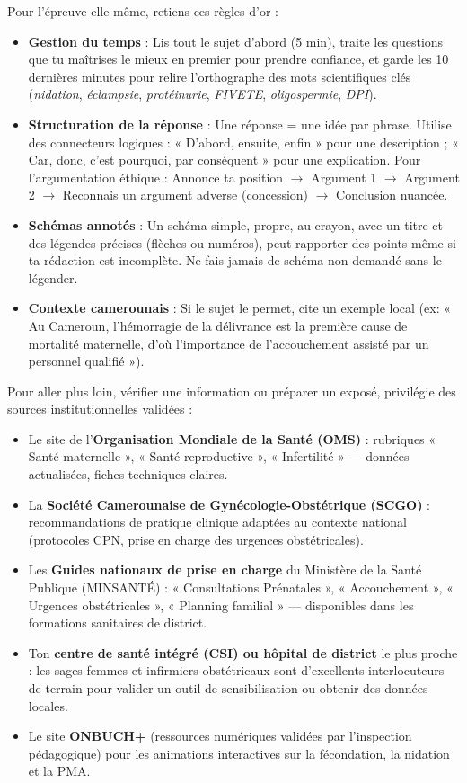 \documentclass[11pt]{article}
\newcounter{popsec}
\newcounter{popsub}
\newcommand{\courssub}[1]{%
  \stepcounter{popsub}%
  \par\vspace{9pt}\noindent{\popxbold\fontsize{11.5}{13}\selectfont\color{popink}{\color{poporange}\thepopsec.\thepopsub}\hspace{6pt}#1}\par\nopagebreak\vspace{4pt}
}
\begin{document}
Pour l'épreuve elle-même, retiens ces règles d'or :
\begin{itemize}
\item \textbf{Gestion du temps} : Lis tout le sujet d'abord (5 min), traite les questions que tu maîtrises le mieux en premier pour prendre confiance, et garde les 10 dernières minutes pour relire l'orthographe des mots scientifiques clés (\emph{nidation}, \emph{éclampsie}, \emph{protéinurie}, \emph{FIVETE}, \emph{oligospermie}, \emph{DPI}).
\item \textbf{Structuration de la réponse} : Une réponse = une idée par phrase. Utilise des connecteurs logiques : « D'abord, ensuite, enfin » pour une description ; « Car, donc, c'est pourquoi, par conséquent » pour une explication. Pour l'argumentation éthique : Annonce ta position $\rightarrow$ Argument 1 $\rightarrow$ Argument 2 $\rightarrow$ Reconnais un argument adverse (concession) $\rightarrow$ Conclusion nuancée.
\item \textbf{Schémas annotés} : Un schéma simple, propre, au crayon, avec un titre et des légendes précises (flèches ou numéros), peut rapporter des points même si ta rédaction est incomplète. Ne fais jamais de schéma non demandé sans le légender.
\item \textbf{Contexte camerounais} : Si le sujet le permet, cite un exemple local (ex: « Au Cameroun, l'hémorragie de la délivrance est la première cause de mortalité maternelle, d'où l'importance de l'accouchement assisté par un personnel qualifié »).
\end{itemize}

\courssub{Ressources complémentaires fiables}

Pour aller plus loin, vérifier une information ou préparer un exposé, privilégie des sources institutionnelles validées :
\begin{itemize}
\item Le site de l'\textbf{Organisation Mondiale de la Santé (OMS)} : rubriques « Santé maternelle », « Santé reproductive », « Infertilité » — données actualisées, fiches techniques claires.
\item La \textbf{Société Camerounaise de Gynécologie-Obstétrique (SCGO)} : recommandations de pratique clinique adaptées au contexte national (protocoles CPN, prise en charge des urgences obstétricales).
\item Les \textbf{Guides nationaux de prise en charge} du Ministère de la Santé Publique (MINSANTÉ) : « Consultations Prénatales », « Accouchement », « Urgences obstétricales », « Planning familial » — disponibles dans les formations sanitaires de district.
\item Ton \textbf{centre de santé intégré (CSI) ou hôpital de district} le plus proche : les sages-femmes et infirmiers obstétricaux sont d'excellents interlocuteurs de terrain pour valider un outil de sensibilisation ou obtenir des données locales.
\item Le site \textbf{ONBUCH+} (ressources numériques validées par l'inspection pédagogique) pour les animations interactives sur la fécondation, la nidation et la PMA.
\end{itemize}
\end{document}
